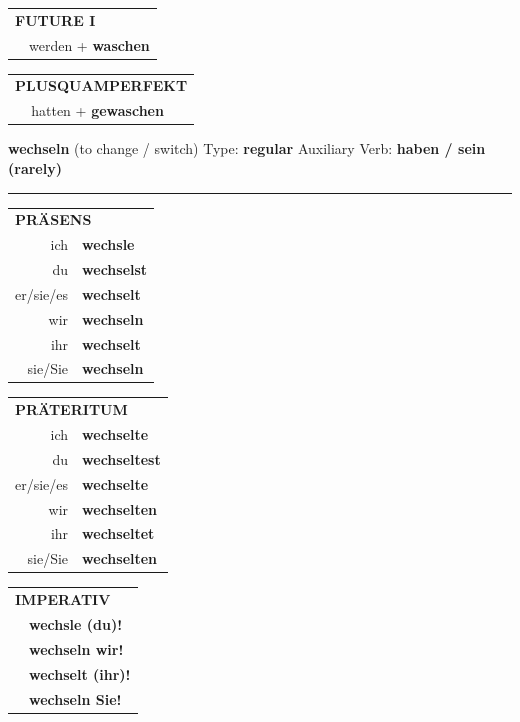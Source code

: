 \documentclass[10pt,a4paper]{revtex4-2}
\begin{document}
\begin{verbbox-acc}
\begin{tabular}{rl}
    \multicolumn{2}{l}{\textbf{FUTURE I} }\\
  &  werden + \textbf{waschen}\\
 
  \end{tabular}
\hfill
   \begin{tabular}{rl}
      \multicolumn{2}{l}{\textbf{PLUSQUAMPERFEKT}}\\
  &  hatten + \textbf{gewaschen}\\
  \end{tabular}
  
  \vspace{-5pt}


\end{verbbox-acc}

\begin{verbbox}
{\Large \bf wechseln} (to change / switch) \hfill Type: \textbf{regular} \hfill Auxiliary Verb: \textbf{haben / sein (rarely)} 

\vspace{5pt}
\hrule
\vspace{5pt}

\begin{tabular}{rl}
\multicolumn{2}{l}{\textbf{PRÄSENS}}\\
ich & \textbf{wechsle}\\
du & \textbf{wechselst}\\
er/sie/es & \textbf{wechselt}\\
wir & \textbf{wechseln}\\
ihr & \textbf{wechselt}\\
sie/Sie & \textbf{wechseln}\\
\end{tabular}
\hfill
\begin{tabular}{rl}
\multicolumn{2}{l}{\textbf{PRÄTERITUM}}\\
ich & \textbf{wechselte}\\
du & \textbf{wechseltest}\\
er/sie/es & \textbf{wechselte}\\
wir & \textbf{wechselten}\\
ihr & \textbf{wechseltet}\\
sie/Sie & \textbf{wechselten}\\
\end{tabular}
\hfill
\begin{tabular}{rl}
\multicolumn{2}{l}{\textbf{IMPERATIV}}\\
& \textbf{wechsle (du)!}\\
& \textbf{wechseln wir!}\\
& \textbf{wechselt (ihr)!}\\
& \textbf{wechseln Sie!}\\
\end{tabular}


\end{verbbox}
\end{document}
